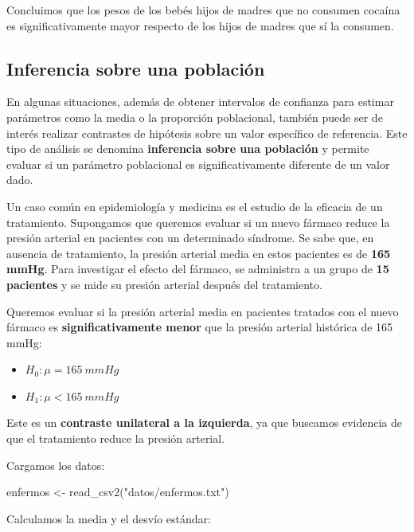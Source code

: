 \documentclass[
  spanish,
  a4paper,
]{scrbook}
\newenvironment{Shaded}{\begin{snugshade}}{\end{snugshade}}
\newcommand{\FunctionTok}[1]{\textcolor[rgb]{0.28,0.35,0.67}{#1}}
\newcommand{\NormalTok}[1]{\textcolor[rgb]{0.00,0.23,0.31}{#1}}
\newcommand{\OtherTok}[1]{\textcolor[rgb]{0.00,0.23,0.31}{#1}}
\newcommand{\StringTok}[1]{\textcolor[rgb]{0.13,0.47,0.30}{#1}}
\begin{document}
Concluimos que los pesos de los bebés hijos de madres que no consumen
cocaína es significativamente mayor respecto de los hijos de madres que
sí la consumen.

\subsection{Inferencia sobre una
población}\label{inferencia-sobre-una-poblaciuxf3n}

En algunas situaciones, además de obtener intervalos de confianza para
estimar parámetros como la media o la proporción poblacional, también
puede ser de interés realizar contrastes de hipótesis sobre un valor
específico de referencia. Este tipo de análisis se denomina
\textbf{inferencia sobre una población} y permite evaluar si un
parámetro poblacional es significativamente diferente de un valor dado.

Un caso común en epidemiología y medicina es el estudio de la eficacia
de un tratamiento. Supongamos que queremos evaluar si un nuevo fármaco
reduce la presión arterial en pacientes con un determinado síndrome. Se
sabe que, en ausencia de tratamiento, la presión arterial media en estos
pacientes es de \textbf{165 mmHg}. Para investigar el efecto del
fármaco, se administra a un grupo de \textbf{15 pacientes} y se mide su
presión arterial después del tratamiento.

Queremos evaluar si la presión arterial media en pacientes tratados con
el nuevo fármaco es \textbf{significativamente menor} que la presión
arterial histórica de 165 mmHg:

\begin{itemize}
\item
  \(H_0: \mu = 165~mmHg\)
\item
  \(H_1: \mu < 165~mmHg\)
\end{itemize}

Este es un \textbf{contraste unilateral a la izquierda}, ya que buscamos
evidencia de que el tratamiento reduce la presión arterial.

Cargamos los datos:

\begin{Shaded}
\begin{Highlighting}[]
\NormalTok{enfermos }\OtherTok{\textless{}{-}} \FunctionTok{read\_csv2}\NormalTok{(}\StringTok{"datos/enfermos.txt"}\NormalTok{)}
\end{Highlighting}
\end{Shaded}

Calculamos la media y el desvío estándar:
\end{document}
